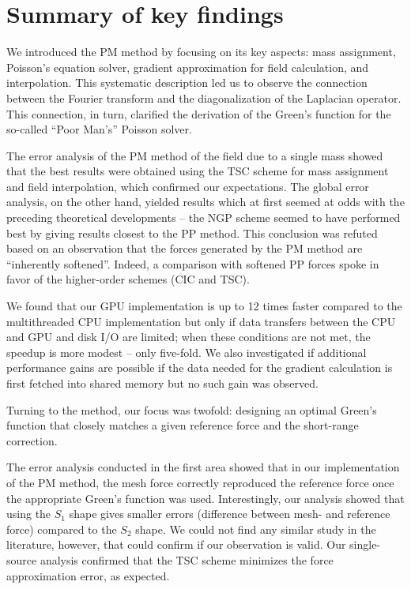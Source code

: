 \section{Summary of key findings}
We introduced the PM method by focusing on its key aspects: mass assignment, Poisson's equation solver, gradient approximation for field calculation, and interpolation.
This systematic description led us to observe the connection between the Fourier transform and the diagonalization of the Laplacian operator.
This connection, in turn, clarified the derivation of the Green's function for the so-called ``Poor Man's'' Poisson solver.

The error analysis of the PM method of the field due to a single mass showed that the best results were obtained using the TSC scheme for mass assignment and field interpolation, which confirmed our expectations.
The global error analysis, on the other hand, yielded results which at first seemed at odds with the preceding theoretical developments -- the NGP scheme seemed to have performed best by giving results closest to the PP method.
This conclusion was refuted based on an observation that the forces generated by the PM method are ``inherently softened''.
Indeed, a comparison with softened PP forces spoke in favor of the higher-order schemes (CIC and TSC).

We found that our GPU implementation is up to 12 times faster compared to the multithreaded CPU implementation but only if data transfers between the CPU and GPU and disk I/O are limited; when these conditions are not met, the speedup is more modest -- only five-fold.
We also investigated if additional performance gains are possible if the data needed for the gradient calculation is first fetched into shared memory but no such gain was observed.

Turning to the \PThreeM{} method, our focus was twofold: designing an optimal Green's function that closely matches a given reference force and the short-range correction.

The error analysis conducted in the first area showed that in our implementation of the PM method, the mesh force correctly reproduced the reference force once the appropriate Green's function was used.
Interestingly, our analysis showed that using the $S_1$ shape gives smaller errors (difference between mesh- and reference force) compared to the $S_2$ shape.
We could not find any similar study in the literature, however, that could confirm if our observation is valid.
Our single-source analysis confirmed that the TSC scheme minimizes the force approximation error, as expected.

